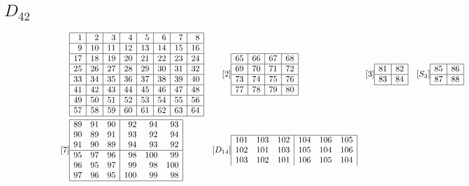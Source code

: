 \documentclass[12pt,a4paper]{amsart}
\begin{document}
\section*{$D_{42}$}
\begin{align*}
[1] &
\begin{array}{|r|r|r|r|r|r|r|r|}%
\hline
1&2&3&4&5&6&7&8\\%
\hline
9&10&11&12&13&14&15&16\\%
\hline
17&18&19&20&21&22&23&24\\%
\hline
25&26&27&28&29&30&31&32\\%
\hline
33&34&35&36&37&38&39&40\\%
\hline
41&42&43&44&45&46&47&48\\%
\hline
49&50&51&52&53&54&55&56\\%
\hline
57&58&59&60&61&62&63&64\\%
\hline
\end{array}&
[2] &
\begin{array}{|r|r|r|r|}%
\hline
65&66&67&68\\%
\hline
69&70&71&72\\%
\hline
73&74&75&76\\%
\hline
77&78&79&80\\%
\hline
\end{array} &
[3] &
\begin{array}{|r|r|}%
\hline
81&82\\%
\hline
83&84\\%
\hline
\end{array} &
[S_3] &
\begin{array}{|r|r|}%
\hline
85&86\\%
\hline
87&88\\%
\hline
\end{array}\\
[7] &
\begin{array}{|rrr|rrr|}%
\hline
89&91&90&92&94&93\\%
90&89&91&93&92&94\\%
91&90&89&94&93&92\\%
\hline
95&97&96&98&100&99\\%
96&95&97&99&98&100\\%
97&96&95&100&99&98\\%
\hline
\end{array} &
[D_{14}] &
\begin{array}{|rrr|rrr|}%
\hline
101&103&102&104&106&105\\%
102&101&103&105&104&106\\%
103&102&101&106&105&104\\%

\end{array}
\end{align*}
\end{document}
